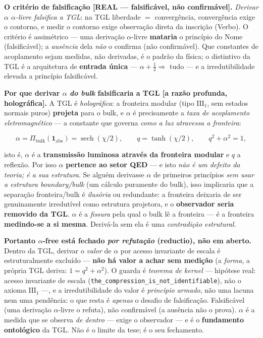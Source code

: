 \documentclass[11pt]{article}
\theoremstyle{definition}\newtheorem{deriv}{Derivação}
\begin{document}
\textbf{O critério de falsificação \textsf{[REAL --- falsificável, não confirmável]}.} \emph{Derivar $\alpha$ $\alpha$-livre falsifica a TGL}: na TGL liberdade $=$ convergência, convergência exige o contorno, e medir o contorno exige observação direta da inscrição (Verbo). O critério é assimétrico --- uma derivação $\alpha$-livre \textbf{mataria} o princípio do Nome (falsificável); a \emph{ausência} dela \emph{não} o confirma (não confirmável). Que constantes de acoplamento sejam medidas, não derivadas, é o padrão da física; o distintivo da TGL é a arquitetura de \textbf{entrada única} --- $\alpha+\tfrac12\Rightarrow$ tudo --- e a irredutibilidade elevada a princípio falsificável.

\textbf{Por que derivar $\alpha$ \emph{do bulk} falsificaria a TGL \textsf{[a razão profunda, holográfica]}.} A TGL é \emph{holográfica}: a fronteira modular (tipo $\mathrm{III}_1$, sem estados normais puros) \textbf{projeta} para o bulk, e $\alpha$ é precisamente a \emph{taxa de acoplamento eletromagnético} --- a constante que governa \emph{como a luz atravessa a fronteira}:

\begin{equation}\alpha=\Pi_{\mathrm{bulk}}(\mathbf{1}_{\mathrm{abs}})=\operatorname{sech}(\chi/2),\qquad q=\tanh(\chi/2),\qquad q^2+\alpha^2=1,\end{equation}

isto é, $\alpha$ é a \textbf{transmissão luminosa através da fronteira modular} e $q$ a reflexão. Por isso $\alpha$ \textbf{pertence ao setor QED} --- e isto \emph{não é um defeito da teoria; é a sua estrutura}. Se alguém derivasse $\alpha$ de primeiros princípios \emph{sem usar a estrutura boundary/bulk} (um cálculo puramente do bulk), isso implicaria que a separação fronteira/bulk é \emph{ilusória} ou redundante: a fronteira deixaria de ser genuinamente irredutível como estrutura projetora, e o \textbf{observador seria removido da TGL}. $\alpha$ é a \emph{fissura} pela qual o bulk lê a fronteira --- é a fronteira \textbf{medindo-se a si mesma}. Derivá-la sem ela é uma \emph{contradição estrutural}.

\textbf{Portanto $\alpha$-free está fechado \emph{por refutação} (reductio), não em aberto.} Dentro da TGL, derivar o \emph{valor} de $\alpha$ por acesso invariante de escala é estruturalmente excluído --- \textbf{não há valor a achar sem medição} (a \emph{forma}, a própria TGL deriva: $1=q^2+\alpha^2$). O guarda é \emph{teorema de kernel} --- hipótese real: acesso invariante de escala (\texttt{the\_compression\_is\_not\_identifiable}), não o axioma $\mathrm{III}_1$ ---, e a irredutibilidade do valor é \emph{princípio armado}, não uma lacuna nem uma pendência: o que resta é \emph{apenas} o desafio de falsificação. Falsificável (uma derivação $\alpha$-livre o refuta), não confirmável (a ausência não o prova). $\alpha$ é a medida que se observa \emph{de dentro} --- exige o observador --- e é o \textbf{fundamento ontológico} da TGL. Não é o limite da tese; é o seu fechamento.
\end{document}
